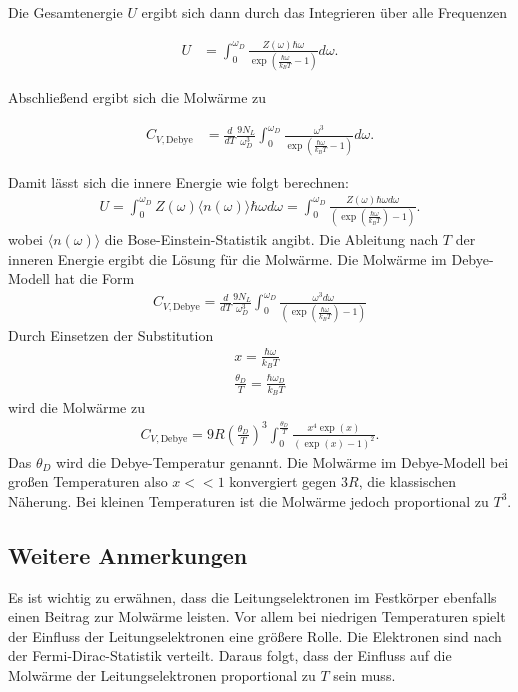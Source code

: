 Die Gesamtenergie $U$ ergibt sich dann durch das Integrieren über alle Frequenzen

\begin{align}
    \label{eqn:udebye}
    U &= \int_0^{\omega_D} \frac{Z(\omega) \hbar \omega}{\exp \left( \frac{\hbar \omega}{k_B T} - 1 \right)} d\omega.
\end{align}

Abschließend ergibt sich die Molwärme zu 

\begin{align}
    C_{V, \text{Debye}} &= \frac{d}{d T} \frac{9 N_L}{\omega_D^3} \int_0^{\omega_D} \frac{\omega^3}{\exp \left(\frac{\hbar \omega}{k_B T} -1 \right)} d \omega.
\end{align}

Damit lässt sich die innere Energie wie folgt berechnen:
\begin{align}
    U =  \int_0^{\omega_D} Z(\omega) \langle n(\omega)\rangle \hbar \omega d \omega=  \int_0^{\omega_D} \frac{Z(\omega) \hbar \omega d \omega}{\left(\exp \left(\frac{\hbar \omega}{k_B T}\right) -1 \right)}.
\end{align}
wobei $\langle n(\omega)\rangle$ die Bose-Einstein-Statistik angibt. Die Ableitung nach $T$ der inneren Energie ergibt die Lösung für die Molwärme. Die Molwärme im Debye-Modell hat die Form
\begin{align}
    C_{V,\text{Debye}}= \frac{d}{d T}\frac{9 N_L}{\omega_D^3} \int_0^{\omega_D} \frac{\omega^3 d\omega}{\left(\exp \left(\frac{\hbar \omega}{k_B T}\right) -1 \right)}
\end{align}
Durch Einsetzen der Substitution 
\begin{align}
    \label{eqn:debyesubst}
    x = \frac{\hbar \omega}{k_B T} \\  \frac{\theta_D}{T} = \frac{\hbar \omega_D}{ k_B T}
\end{align}
wird die Molwärme zu
\begin{align}
    C_{V,\text{Debye}} = 9 R \left(\frac{\theta_D}{T}\right)^3 \int_0^{\frac{\theta_D}{T}} \frac{x^4 \exp \left(x\right)}{ \left(\exp(x) -1\right)^2}.
\end{align}
Das $\theta_D$ wird die Debye-Temperatur genannt. Die Molwärme im Debye-Modell bei großen Temperaturen also $x<<1$ konvergiert gegen $3 R$, die klassischen Näherung. Bei kleinen Temperaturen ist die Molwärme 
jedoch proportional zu $T^3$. 
\subsection{Weitere Anmerkungen}
Es ist wichtig zu erwähnen, dass die Leitungselektronen im Festkörper ebenfalls einen Beitrag zur Molwärme leisten. Vor allem bei niedrigen Temperaturen spielt der Einfluss der Leitungselektronen eine größere Rolle. 
Die Elektronen sind nach der Fermi-Dirac-Statistik verteilt. Daraus folgt, dass der Einfluss auf die Molwärme der Leitungselektronen proportional zu $T$ sein muss. \\
